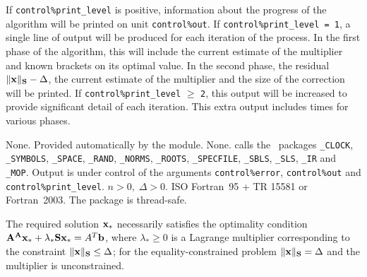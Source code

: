 \documentclass{galahad}
\newcommand{\packagename}{LLST}
\begin{document}

\galinfo
If {\tt control\%print\_level} is positive, information about the progress 
of the algorithm will be printed on unit {\tt control\-\%\-out}.
If {\tt control\%print\_level = 1}, a single line of output will be produced  
for each iteration of the process. In the first phase of the algorithm,
this will include the current estimate of the multiplier and known
brackets on its optimal value. In the second phase, the residual
$\|{\mathbf{x}}\|_{{\mathbf{S}}} - \Delta$, the current estimate of the multiplier and
the size of the correction will be printed.
If {\tt control\%print\_level} $\geq$ {\tt 2}, this  
output will be increased to provide significant detail of each iteration.  
This extra output includes times for various phases.


\galgeneral

\galcommon None.
\galworkspace Provided automatically by the module.
\galroutines None.
\galmodules {\tt \packagename\_solve} calls the \galahad\ packages 
{\tt \libraryname\_CLOCK}, 
{\tt \libraryname\_SY\-M\-BOLS}, 
{\tt \libraryname\_\-SPACE}, 
{\tt \libraryname\-\_\-RAND}, 
{\tt \libraryname\_\-NORMS}, 
{\tt \libraryname\_\-ROOTS}, 
{\tt \libraryname\_SPECFILE},
{\tt \libraryname\_SBLS}, 
{\tt \libraryname\_SLS}, 
{\tt \libraryname\_IR}
and
{\tt \libraryname\_MOP}.
\galio Output is under control of the arguments 
{\tt control\%error}, {\tt control\%out} and {\tt control\%print\_level}.
\galrestrictions $n  >  0, \;  \Delta  >  0$.
\galportability ISO Fortran~95 + TR 15581 or Fortran~2003.
The package is thread-safe.


\galmethod
The required solution ${\mathbf{x}}_*$ necessarily satisfies the optimality condition 
${\mathbf{A}}^ {\mathbf{A}} {\mathbf{x}}_* + \lambda_* {\mathbf{S}} {\mathbf{x}}_* = A^T {\mathbf{b}}$,
where $\lambda_* \geq 0$ is a Lagrange 
multiplier corresponding to the constraint $\|{\mathbf{x}}\|_{{\mathbf{S}}}  \leq  \Delta$;
for the equality-constrained problem $\|{\mathbf{x}}\|_{{\mathbf{S}}} = \Delta$ and
the multiplier is unconstrained.
 
\end{document}
